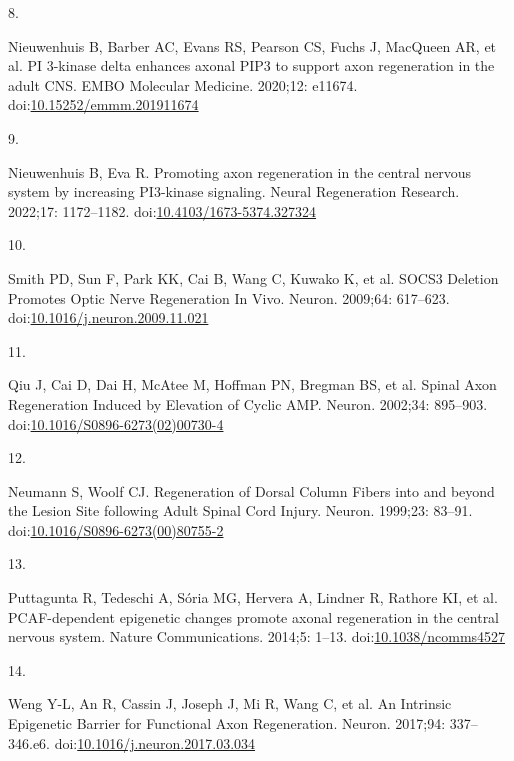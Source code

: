 \documentclass[
  12pt,
  a4paper,
]{article}
\newlength{\cslhangindent}
\newlength{\csllabelwidth}
\newlength{\cslentryspacingunit} %
\newenvironment{CSLReferences}[2] %
 {%
  \setlength{\parindent}{0pt}
  \ifodd #1
  \let\oldpar\par
  \def\par{\hangindent=\cslhangindent\oldpar}
  \fi
  \setlength{\parskip}{#2\cslentryspacingunit}
 }%
 {}
\newcommand{\CSLLeftMargin}[1]{\parbox[t]{\csllabelwidth}{#1}}
\newcommand{\CSLRightInline}[1]{\parbox[t]{\linewidth - \csllabelwidth}{#1}\break}
\begin{document}
\begin{CSLReferences}{0}{0}
\leavevmode{}%
\CSLLeftMargin{8. }%
\CSLRightInline{Nieuwenhuis B, Barber AC, Evans RS, Pearson CS, Fuchs J,
MacQueen AR, et al. {PI} 3-kinase delta enhances axonal {PIP3} to
support axon regeneration in the adult {CNS}. EMBO Molecular Medicine.
2020;12: e11674.
doi:\href{https://doi.org/10.15252/emmm.201911674}{10.15252/emmm.201911674}}

\leavevmode{}%
\CSLLeftMargin{9. }%
\CSLRightInline{Nieuwenhuis B, Eva R. Promoting axon regeneration in the
central nervous system by increasing {PI3-kinase} signaling. Neural
Regeneration Research. 2022;17: 1172--1182.
doi:\href{https://doi.org/10.4103/1673-5374.327324}{10.4103/1673-5374.327324}}

\leavevmode{}%
\CSLLeftMargin{10. }%
\CSLRightInline{Smith PD, Sun F, Park KK, Cai B, Wang C, Kuwako K, et
al. {SOCS3 Deletion Promotes Optic Nerve Regeneration In Vivo}. Neuron.
2009;64: 617--623.
doi:\href{https://doi.org/10.1016/j.neuron.2009.11.021}{10.1016/j.neuron.2009.11.021}}

\leavevmode{}%
\CSLLeftMargin{11. }%
\CSLRightInline{Qiu J, Cai D, Dai H, McAtee M, Hoffman PN, Bregman BS,
et al. Spinal {Axon Regeneration Induced} by {Elevation} of {Cyclic
AMP}. Neuron. 2002;34: 895--903.
doi:\href{https://doi.org/10.1016/S0896-6273(02)00730-4}{10.1016/S0896-6273(02)00730-4}}

\leavevmode{}%
\CSLLeftMargin{12. }%
\CSLRightInline{Neumann S, Woolf CJ. Regeneration of {Dorsal Column
Fibers} into and beyond the {Lesion Site} following {Adult Spinal Cord
Injury}. Neuron. 1999;23: 83--91.
doi:\href{https://doi.org/10.1016/S0896-6273(00)80755-2}{10.1016/S0896-6273(00)80755-2}}

\leavevmode{}%
\CSLLeftMargin{13. }%
\CSLRightInline{Puttagunta R, Tedeschi A, Sória MG, Hervera A, Lindner
R, Rathore KI, et al. {PCAF-dependent} epigenetic changes promote axonal
regeneration in the central nervous system. Nature Communications.
2014;5: 1--13.
doi:\href{https://doi.org/10.1038/ncomms4527}{10.1038/ncomms4527}}

\leavevmode{}%
\CSLLeftMargin{14. }%
\CSLRightInline{Weng Y-L, An R, Cassin J, Joseph J, Mi R, Wang C, et al.
An {Intrinsic Epigenetic Barrier} for {Functional Axon Regeneration}.
Neuron. 2017;94: 337--346.e6.
doi:\href{https://doi.org/10.1016/j.neuron.2017.03.034}{10.1016/j.neuron.2017.03.034}}


\end{CSLReferences}
\end{document}

